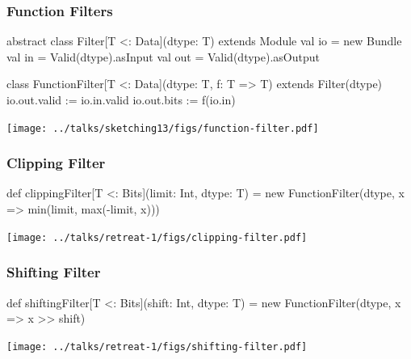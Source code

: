 \documentclass[xcolor=pdflatex,dvipsnames,table]{beamer}
\begin{document}
\begin{frame}[fragile]
\frametitle{Function Filters}

\begin{footnotesize}
\begin{scala}
abstract class Filter[T <: Data](dtype: T) extends Module {
  val io = new Bundle {
    val in  = Valid(dtype).asInput
    val out = Valid(dtype).asOutput
} }

class FunctionFilter[T <: Data](dtype: T, f: T => T) extends Filter(dtype) {
  io.out.valid := io.in.valid
  io.out.bits  := f(io.in)
}
\end{scala}
\end{footnotesize}

\begin{center}
\texttt{[image: ../talks/sketching13/figs/function-filter.pdf]} 
\end{center}


\end{frame}

\begin{frame}[fragile]
\frametitle{Clipping Filter}

\begin{footnotesize}
\begin{scala}
def clippingFilter[T <: Bits](limit: Int, dtype: T) = 
  new FunctionFilter(dtype, x => min(limit, max(-limit, x)))
\end{scala}
\end{footnotesize}

\begin{center}
\texttt{[image: ../talks/retreat-1/figs/clipping-filter.pdf]} 
\end{center}
\end{frame}


\begin{frame}[fragile]
\frametitle{Shifting Filter}

\begin{footnotesize}
\begin{scala}
def shiftingFilter[T <: Bits](shift: Int, dtype: T) = 
  new FunctionFilter(dtype, x => x >> shift)
\end{scala}
\end{footnotesize}

\begin{center}
\texttt{[image: ../talks/retreat-1/figs/shifting-filter.pdf]} 
\end{center}
\end{frame}
\end{document}
